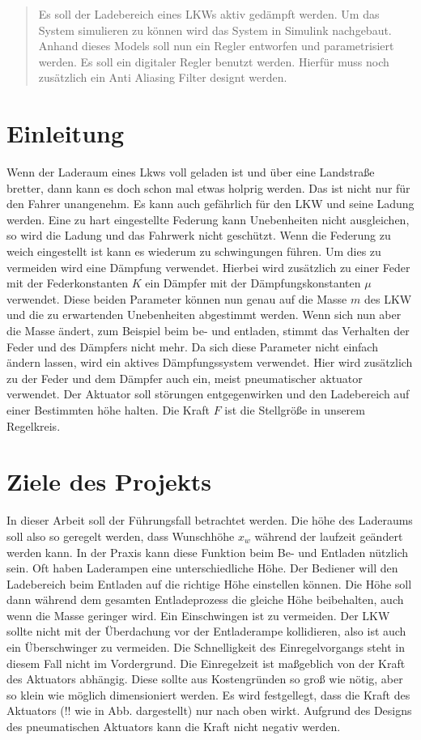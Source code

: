 	\begin{abstract} %
		Es soll der Ladebereich eines LKWs aktiv gedämpft werden. Um das System simulieren zu können wird das System in Simulink nachgebaut. Anhand dieses Models soll nun 
		ein Regler entworfen und parametrisiert werden. Es soll ein digitaler Regler benutzt werden. 
		Hierfür muss noch zusätzlich ein Anti Aliasing Filter designt werden.
	\end{abstract}
	
	\section{Einleitung}
	Wenn der Laderaum eines Lkws voll geladen ist und über eine Landstraße bretter, dann kann es doch schon mal etwas holprig werden. Das ist nicht nur für den Fahrer unangenehm. Es kann auch gefährlich für den LKW und seine Ladung werden.
	Eine zu hart eingestellte Federung kann Unebenheiten nicht ausgleichen, so wird die Ladung und das Fahrwerk nicht geschützt. Wenn die Federung zu weich eingestellt ist kann es 
	wiederum zu schwingungen führen. Um dies zu vermeiden wird eine Dämpfung verwendet. Hierbei wird zusätzlich zu einer Feder mit der Federkonstanten $K$ ein Dämpfer mit der Dämpfungskonstanten $\mu$ verwendet. 
	Diese beiden Parameter können nun genau auf die Masse $m$ des LKW und die zu erwartenden Unebenheiten abgestimmt werden. 
	Wenn sich nun aber die Masse ändert, zum Beispiel beim be- und entladen, stimmt das Verhalten der Feder und des Dämpfers nicht mehr.
	Da sich diese Parameter nicht einfach ändern lassen, wird ein aktives Dämpfungssystem verwendet. Hier wird zusätzlich zu der Feder und dem Dämpfer 
	auch ein, meist pneumatischer aktuator verwendet. Der Aktuator soll störungen entgegenwirken und den Ladebereich auf einer Bestimmten höhe halten.
	Die Kraft $F$ ist die Stellgröße in unserem Regelkreis.
		
	\section{Ziele des Projekts}
	In dieser Arbeit soll der Führungsfall betrachtet werden. Die höhe des Laderaums soll also so geregelt werden, dass Wunschhöhe $x_{w}$ während der laufzeit geändert werden kann.
	In der Praxis kann diese Funktion beim Be- und Entladen nützlich sein. Oft haben Laderampen eine unterschiedliche Höhe. Der Bediener will den Ladebereich
	beim Entladen auf die richtige Höhe einstellen können. Die Höhe soll dann während dem gesamten Entladeprozess die gleiche Höhe beibehalten, auch wenn die Masse geringer wird.
	Ein Einschwingen ist zu vermeiden. Der LKW sollte nicht mit der Überdachung vor der Entladerampe kollidieren, also ist auch ein Überschwinger zu vermeiden.
	Die Schnelligkeit des Einregelvorgangs steht in diesem Fall nicht im Vordergrund. Die Einregelzeit ist maßgeblich von der Kraft des Aktuators abhängig.
	Diese sollte aus Kostengründen so groß wie nötig, aber so klein wie möglich dimensioniert werden. 
	Es wird festgellegt, dass die Kraft des Aktuators (!! wie in Abb. dargestellt) nur nach oben wirkt. Aufgrund des Designs des pneumatischen Aktuators kann 
	die Kraft nicht negativ werden.

